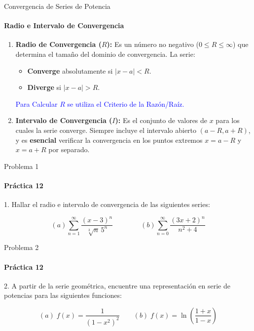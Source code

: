 \documentclass{plantillaPPT}
\begin{document}
\begin{frame}{Convergencia de Series de Potencia}
\framesubtitle{Radio e Intervalo de Convergencia}

\small %
\begin{enumerate}
    \item \textbf{Radio de Convergencia ($R$):} Es un número no negativo ($0 \le R \le \infty$) que determina el tamaño del dominio de convergencia. La serie:
    \begin{itemize}
        \item \textbf{Converge} absolutamente si $|x-a| < R$.
        \item \textbf{Diverge} si $|x-a| > R$.
    \end{itemize}
    \textcolor{blue}{Para Calcular $R$ se utiliza el Criterio de la Razón/Raíz.}
    \vspace{0.5cm}
    \item \textbf{Intervalo de Convergencia ($I$):} Es el conjunto de valores de $x$ para los cuales la serie converge. Siempre incluye el intervalo abierto $(a-R, a+R)$, y es \textbf{esencial} verificar la convergencia en los puntos extremos $x=a-R$ y $x=a+R$ por separado.
\end{enumerate}
\end{frame}

\begin{frame}{Problema 1}
    \framesubtitle{Práctica 12}

    1. Hallar el radio e intervalo de convergencia de las siguientes series:

    \begin{equation*}
        (a)\sum_{n=1}^\infty \frac{(x-3)^n}{\sqrt[3]{n}\,5^n} \qquad \qquad (b) \sum_{n=0}^\infty \frac{(3x+2)^n}{n^2+4}
    \end{equation*}
\end{frame}

\begin{frame}{Problema 2}
    \framesubtitle{Práctica 12}

    2. A partir de la serie geométrica, encuentre una representación en serie de potencias para las siguientes funciones: 
    
    \begin{equation*}
        (a) \; f(x)= \frac{1}{(1-x^2)^2} \qquad (b)\; f(x)= \ln\left(\frac{1+x}{1-x}\right)
    \end{equation*}

\end{frame}
\end{document}
